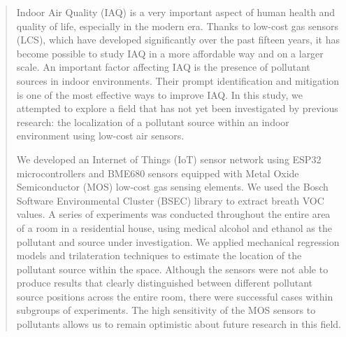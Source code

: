 \renewcommand{\abstractname}{Abstract}
\begin{abstract}

Indoor Air Quality (IAQ) is a very important aspect of human health and quality of life, especially in the modern era.
Thanks to low-cost gas sensors (LCS), which have developed significantly over the past fifteen years, it has become possible to study IAQ in a more affordable way and on a larger scale.
An important factor affecting IAQ is the presence of pollutant sources in indoor environments. Their prompt identification and mitigation is one of the most effective ways to improve IAQ.
In this study, we attempted to explore a field that has not yet been investigated by previous research: the localization of a pollutant source within an indoor environment using low-cost air sensors.

We developed an Internet of Things (IoT) sensor network using ESP32 microcontrollers and BME680 sensors equipped with Metal Oxide Semiconductor (MOS) low-cost gas sensing elements. We used the Bosch Software Environmental Cluster (BSEC) library to extract breath VOC values.
A series of experiments was conducted throughout the entire area of a room in a residential house, using medical alcohol and ethanol as the pollutant and source under investigation.
We applied mechanical regression models and trilateration techniques to estimate the location of the pollutant source within the space.
Although the sensors were not able to produce results that clearly distinguished between different pollutant source positions across the entire room, there were successful cases within subgroups of experiments. The high sensitivity of the MOS sensors to pollutants allows us to remain optimistic about future research in this field.



\end{abstract}